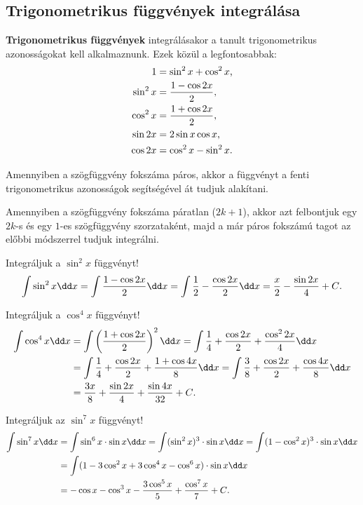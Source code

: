\subsection{Trigonometrikus függvények integrálása}
\begin{blueBox}
  \textbf{Trigonometrikus függvények} integrálásakor a tanult trigonometrikus
  azonosságokat kell alkalmaznunk. Ezek közül a legfontosabbak:
  \begin{align*}
    1        & = \sin^2 x + \cos^2 x \text,   \\
    \sin^2 x & = \frac{1 - \cos 2x}{2} \text, \\
    \cos^2 x & = \frac{1 + \cos 2x}{2} \text, \\
    \sin 2x  & = 2 \sin x \cos x \text,       \\
    \cos 2x  & = \cos^2 x - \sin^2 x \text.
  \end{align*}

  Amennyiben a szögfüggvény fokszáma páros, akkor a függvényt a fenti
  trigonometrikus azonosságok segítségével át tudjuk alakítani.

  Amennyiben a szögfüggvény fokszáma páratlan ($2k + 1$), akkor azt felbontjuk
  egy $2k$-s és egy $1$-es szögfüggvény szorzataként, majd a már páros fokszámú
  tagot az előbbi módszerrel tudjuk integrálni.
\end{blueBox}

\begin{example}
  Integráljuk a $\sin^2 x$ függvényt!
  \[
    \int \sin^2 x \dd x
    = \int \frac{1 - \cos 2x}{2} \dd x
    = \int \frac{1}{2} - \frac{\cos 2x}{2} \dd x
    = \frac{x}{2} - \frac{\sin 2x}{4} + C
    \text.
  \]
\end{example}

\begin{example}
  Integráljuk a $\cos^4 x$ függvényt!
  \begin{align*}
    \int \cos^4 x \dd x
     & = \int \left( \frac{1 + \cos 2x}{2} \right)^2 \dd x
    = \int \frac{1}{4} + \frac{\cos 2x}{2} + \frac{\cos^2 2x }{4} \dd x
    \\
     & = \int \frac{1}{4} + \frac{\cos 2x}{2} + \frac{1 + \cos 4x}{8} \dd x
    = \int \frac{3}{8} + \frac{\cos 2x}{2} + \frac{\cos 4x}{8} \dd x
    \\
     & = \frac{3x}{8} + \frac{\sin 2x}{4} + \frac{\sin 4x}{32} + C
    \text.
  \end{align*}
\end{example}

\begin{example}
  Integráljuk az $\sin^7 x$ függvényt!
  \begin{align*}
    \int \sin^7 x \dd x
     & = \int \sin^6 x \cdot \sin x \dd x
    = \int (\sin^2 x)^3 \cdot \sin x \dd x
    = \int (1 - \cos^2 x)^3 \cdot \sin x \dd x
    \\
     & = \int (1 - 3 \cos^2 x + 3 \cos^4 x - \cos^6 x) \cdot \sin x \dd x
    \\
     & = -\cos x - \cos^3 x - \frac{3\cos^5 x}{5} + \frac{\cos^7 x}{7} + C
    \text.
  \end{align*}
\end{example}
